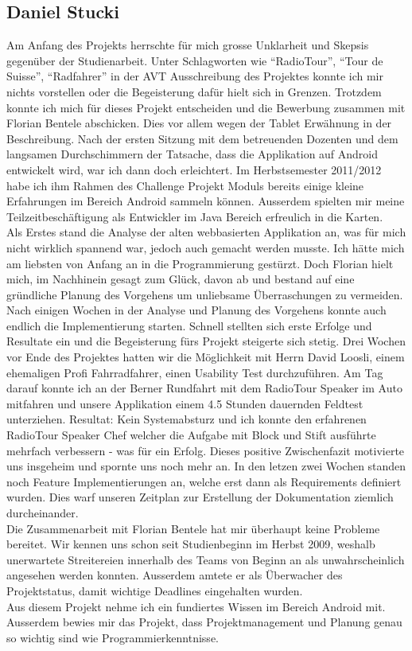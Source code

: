 \subsection{Daniel Stucki}
Am Anfang des Projekts herrschte für mich grosse Unklarheit und Skepsis gegenüber der Studienarbeit. Unter Schlagworten wie "`RadioTour"', "`Tour de Suisse"', "`Radfahrer"' in der AVT Ausschreibung des Projektes konnte ich mir nichts vorstellen oder die Begeisterung dafür hielt sich in Grenzen. Trotzdem konnte ich mich für dieses Projekt entscheiden und die Bewerbung zusammen mit Florian Bentele abschicken. Dies vor allem wegen der Tablet Erwähnung in der Beschreibung. Nach der ersten Sitzung mit dem betreuenden Dozenten und dem langsamen Durchschimmern der Tatsache, dass die Applikation auf Android entwickelt wird, war ich dann doch erleichtert. Im Herbstsemester 2011/2012 habe ich ihm Rahmen des Challenge Projekt Moduls bereits einige kleine Erfahrungen im Bereich Android sammeln können. Ausserdem spielten mir meine Teilzeitbeschäftigung als Entwickler im Java Bereich erfreulich in die Karten.
\\
Als Erstes stand die Analyse der alten webbasierten Applikation an, was für mich nicht wirklich spannend war, jedoch auch gemacht werden musste. Ich hätte mich am liebsten von Anfang an in die Programmierung gestürzt. Doch Florian hielt mich, im Nachhinein gesagt zum Glück, davon ab und bestand auf eine gründliche Planung des Vorgehens um unliebsame Überraschungen zu vermeiden. Nach einigen Wochen in der Analyse und Planung des Vorgehens konnte auch endlich die Implementierung starten. Schnell stellten sich erste Erfolge und Resultate ein und die Begeisterung fürs Projekt steigerte sich stetig. Drei Wochen vor Ende des Projektes hatten wir die Möglichkeit mit Herrn David Loosli, einem ehemaligen Profi Fahrradfahrer, einen Usability Test durchzuführen. Am Tag darauf konnte ich an der Berner Rundfahrt mit dem RadioTour Speaker im Auto mitfahren und unsere Applikation einem 4.5 Stunden dauernden Feldtest unterziehen. Resultat: Kein Systemabsturz und ich konnte den erfahrenen RadioTour Speaker Chef welcher die Aufgabe mit Block und Stift ausführte mehrfach verbessern - was für ein Erfolg. Dieses positive Zwischenfazit motivierte uns insgeheim und spornte uns noch mehr an. In den letzen zwei Wochen standen noch Feature Implementierungen an, welche erst dann als Requirements definiert wurden. Dies warf unseren Zeitplan zur Erstellung der Dokumentation ziemlich durcheinander.
\\
Die Zusammenarbeit mit Florian Bentele hat mir überhaupt keine Probleme bereitet. Wir kennen uns schon seit Studienbeginn im Herbst 2009, weshalb unerwartete Streitereien innerhalb des Teams von Beginn an als unwahrscheinlich angesehen werden konnten. Ausserdem amtete er als Überwacher des Projektstatus, damit wichtige Deadlines eingehalten wurden.
\\
Aus diesem Projekt nehme ich ein fundiertes Wissen im Bereich Android mit. Ausserdem bewies mir das Projekt, dass Projektmanagement und Planung genau so wichtig sind wie Programmierkenntnisse. 

